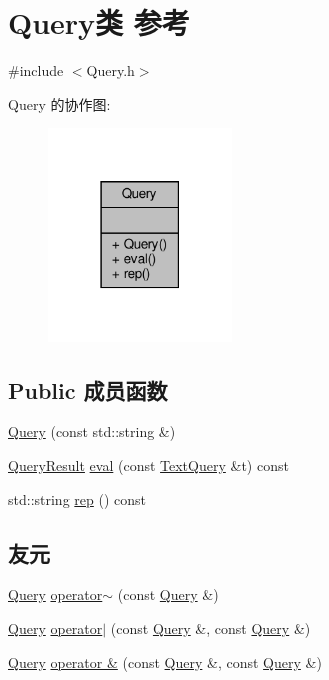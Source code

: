 \hypertarget{classQuery}{}\section{Query类 参考}
\label{classQuery}


{\ttfamily \#include $<$Query.\+h$>$}



Query 的协作图\+:\nopagebreak
\begin{figure}[H]
\begin{center}
\leavevmode
\includegraphics[width=138pt]{classQuery__coll__graph}
\end{center}
\end{figure}
\subsection*{Public 成员函数}
\begin{DoxyCompactItemize}
\item 
\hyperlink{classQuery_a60d539aa013ee1f13ff99034a1836d89}{Query} (const std\+::string \&)
\item 
\hyperlink{classQueryResult}{Query\+Result} \hyperlink{classQuery_aac65ca23ad50e878e89e831ca3c8b833}{eval} (const \hyperlink{classTextQuery}{Text\+Query} \&t) const
\item 
std\+::string \hyperlink{classQuery_a44d3f3eb47e3c7744356f12b04a6f4ac}{rep} () const
\end{DoxyCompactItemize}
\subsection*{友元}
\begin{DoxyCompactItemize}
\item 
\hyperlink{classQuery}{Query} \hyperlink{classQuery_afa815c3d9f1296e687770014302bac9a}{operator$\sim$} (const \hyperlink{classQuery}{Query} \&)
\item 
\hyperlink{classQuery}{Query} \hyperlink{classQuery_a51852e29f84c14afd70921a21cab6074}{operator$\vert$} (const \hyperlink{classQuery}{Query} \&, const \hyperlink{classQuery}{Query} \&)
\item 
\hyperlink{classQuery}{Query} \hyperlink{classQuery_a9669c004503314734a5671692f392812}{operator \&} (const \hyperlink{classQuery}{Query} \&, const \hyperlink{classQuery}{Query} \&)
\end{DoxyCompactItemize}


